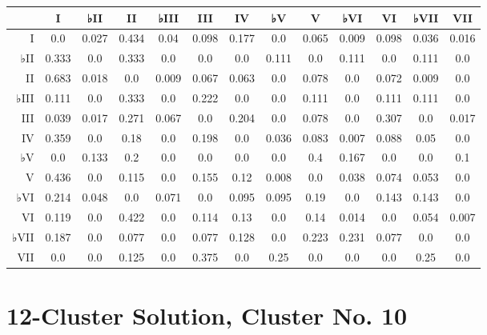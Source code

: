 \begin{table}[htbp]
\begin{minipage}{\linewidth}
\setlength{\tymax}{0.5\linewidth}
\centering
\small
\begin{tabulary}{\textwidth}{@{}RCCCCCCCCCCCC@{}} \toprule
&I&♭II&II&♭III&III&IV&♭V&V&♭VI&VI&♭VII&VII\\
\midrule
I&0.0&0.027&0.434&0.04&0.098&0.177&0.0&0.065&0.009&0.098&0.036&0.016\\
♭II&0.333&0.0&0.333&0.0&0.0&0.0&0.111&0.0&0.111&0.0&0.111&0.0\\
II&0.683&0.018&0.0&0.009&0.067&0.063&0.0&0.078&0.0&0.072&0.009&0.0\\
♭III&0.111&0.0&0.333&0.0&0.222&0.0&0.0&0.111&0.0&0.111&0.111&0.0\\
III&0.039&0.017&0.271&0.067&0.0&0.204&0.0&0.078&0.0&0.307&0.0&0.017\\
IV&0.359&0.0&0.18&0.0&0.198&0.0&0.036&0.083&0.007&0.088&0.05&0.0\\
♭V&0.0&0.133&0.2&0.0&0.0&0.0&0.0&0.4&0.167&0.0&0.0&0.1\\
V&0.436&0.0&0.115&0.0&0.155&0.12&0.008&0.0&0.038&0.074&0.053&0.0\\
♭VI&0.214&0.048&0.0&0.071&0.0&0.095&0.095&0.19&0.0&0.143&0.143&0.0\\
VI&0.119&0.0&0.422&0.0&0.114&0.13&0.0&0.14&0.014&0.0&0.054&0.007\\
♭VII&0.187&0.0&0.077&0.0&0.077&0.128&0.0&0.223&0.231&0.077&0.0&0.0\\
VII&0.0&0.0&0.125&0.0&0.375&0.0&0.25&0.0&0.0&0.0&0.25&0.0\\

\bottomrule

\end{tabulary}
\end{minipage}
\end{table}

\section{12-Cluster Solution, Cluster No. 10}
\label{12-clustersolutionclusterno.10}

